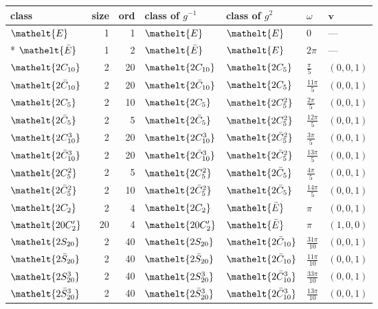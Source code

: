 \documentclass[10pt,a4paper]{article}
\numberwithin{equation}{section}
\newcommand{\eltfont}[1]{{\let\sigma\eltsigma\mathelt{#1}}}
\newcommand{\cls}[1]{\eltfont{#1}}
\newcommand{\dirvec}[3]{(#1, #2, #3)}
\newcommand{\vv}{\mathbf{v}}
\newcommand{\barred}[1]{\bar{#1}}
\begin{document}
{\renewcommand{\arraystretch}{1.3}\begin{longtable}{@{}lrrllll@{}}\toprule
class & size & ord & class of $g^{-1}$ & class of $g^{2}$ & $\omega$ & $\vv$\\\midrule\endhead
\bottomrule\endfoot\endlastfoot
$\cls{E}$ & 1 & 1 & $\cls{E}$ & $\cls{E}$ & $0$ & ---\\*
$\cls{\barred{E}}$ & 1 & 2 & $\cls{\barred{E}}$ & $\cls{E}$ & $2\pi$ & ---\\
$\cls{2C_{10}}$ & 2 & 20 & $\cls{2C_{10}}$ & $\cls{2C_{5}}$ & $\tfrac{\pi}{5}$ & $\dirvec{0}{0}{1}$\\
$\cls{2\barred{C}_{10}}$ & 2 & 20 & $\cls{2\barred{C}_{10}}$ & $\cls{2C_{5}}$ & $\tfrac{11\pi}{5}$ & $\dirvec{0}{0}{1}$\\
$\cls{2C_{5}}$ & 2 & 10 & $\cls{2C_{5}}$ & $\cls{2C_{5}^{2}}$ & $\tfrac{2\pi}{5}$ & $\dirvec{0}{0}{1}$\\
$\cls{2\barred{C}_{5}}$ & 2 & 5 & $\cls{2\barred{C}_{5}}$ & $\cls{2C_{5}^{2}}$ & $\tfrac{12\pi}{5}$ & $\dirvec{0}{0}{1}$\\
$\cls{2C_{10}^{3}}$ & 2 & 20 & $\cls{2C_{10}^{3}}$ & $\cls{2\barred{C}_{5}^{2}}$ & $\tfrac{3\pi}{5}$ & $\dirvec{0}{0}{1}$\\
$\cls{2\barred{C}_{10}^{3}}$ & 2 & 20 & $\cls{2\barred{C}_{10}^{3}}$ & $\cls{2\barred{C}_{5}^{2}}$ & $\tfrac{13\pi}{5}$ & $\dirvec{0}{0}{1}$\\
$\cls{2C_{5}^{2}}$ & 2 & 5 & $\cls{2C_{5}^{2}}$ & $\cls{2\barred{C}_{5}}$ & $\tfrac{4\pi}{5}$ & $\dirvec{0}{0}{1}$\\
$\cls{2\barred{C}_{5}^{2}}$ & 2 & 10 & $\cls{2\barred{C}_{5}^{2}}$ & $\cls{2\barred{C}_{5}}$ & $\tfrac{14\pi}{5}$ & $\dirvec{0}{0}{1}$\\
$\cls{2C_{2}}$ & 2 & 4 & $\cls{2C_{2}}$ & $\cls{\barred{E}}$ & $\pi$ & $\dirvec{0}{0}{1}$\\
$\cls{20C_{2}'}$ & 20 & 4 & $\cls{20C_{2}'}$ & $\cls{\barred{E}}$ & $\pi$ & $\dirvec{1}{0}{0}$\\
$\cls{2S_{20}}$ & 2 & 40 & $\cls{2S_{20}}$ & $\cls{2\barred{C}_{10}}$ & $\tfrac{31\pi}{10}$ & $\dirvec{0}{0}{1}$\\
$\cls{2\barred{S}_{20}}$ & 2 & 40 & $\cls{2\barred{S}_{20}}$ & $\cls{2\barred{C}_{10}}$ & $\tfrac{11\pi}{10}$ & $\dirvec{0}{0}{1}$\\
$\cls{2S_{20}^{3}}$ & 2 & 40 & $\cls{2S_{20}^{3}}$ & $\cls{2\barred{C}_{10}^{3}}$ & $\tfrac{33\pi}{10}$ & $\dirvec{0}{0}{1}$\\
$\cls{2\barred{S}_{20}^{3}}$ & 2 & 40 & $\cls{2\barred{S}_{20}^{3}}$ & $\cls{2\barred{C}_{10}^{3}}$ & $\tfrac{13\pi}{10}$ & $\dirvec{0}{0}{1}$\\

\end{longtable}}
\end{document}
